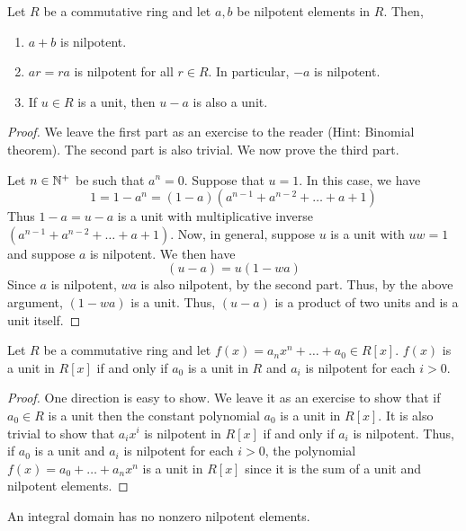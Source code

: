 \begin{prop} \label{prop:nilpotent-properties}
    Let $R$ be a commutative ring and let $a,b$ be nilpotent elements in $R$. Then, 
    \begin{enumerate}
        \item $a+b$ is nilpotent.
        \item $ar = ra$ is nilpotent for all $r \in R$. In particular, $-a$ is nilpotent.
        \item If $u \in R$ is a unit, then $u-a$ is also a unit.
    \end{enumerate}
\end{prop}
\begin{proof}
    We leave the first part as an exercise to the reader (Hint: Binomial theorem). The second part is also trivial. We now prove the third part. 
    
    \medskip
    
    Let $n \in \mathbb{N}^+$ be such that $a^n = 0$. Suppose that $u = 1$. In this case, we have
    \[
        1 = 1 - a^n = (1-a)(a^{n-1} + a^{n-2} + \ldots + a + 1)
    \]
    Thus $1-a = u-a$ is a unit with multiplicative inverse $(a^{n-1} + a^{n-2} + \ldots + a + 1)$. Now, in general, suppose $u$ is a unit with $uw = 1$ and suppose $a$ is nilpotent. We then have
    \[  
        (u-a) = u(1 - wa)
    \]
    Since $a$ is nilpotent, $wa$ is also nilpotent, by the second part. Thus, by the above argument, $(1-wa)$ is a unit. Thus, $(u-a)$ is a product of two units and is a unit itself.
\end{proof}

\begin{theorem} \label{thm:condition-for-unit-in-polynomial-ring}
    Let $R$ be a commutative ring and let $f(x) = a_nx^n + \ldots + a_0 \in R[x]$. $f(x)$ is a unit in $R[x]$ if and only if $a_0$ is a unit in $R$ and $a_i$ is nilpotent for each $i > 0$.
\end{theorem}
\begin{proof}
    One direction is easy to show. We leave it as an exercise to show that if $a_0 \in R$ is a unit then the constant polynomial $a_0$ is a unit in $R[x]$. It is also trivial to show that $a_i x^i$ is nilpotent in $R[x]$ if and only if $a_i$ is nilpotent. Thus, if $a_0$ is a unit and $a_i$ is nilpotent for each $i>0$, the polynomial $f(x) = a_0 + \ldots + a_nx^n$ is a unit in $R[x]$ since it is the sum of a unit and nilpotent elements.
\end{proof}

\begin{prop} \label{prop:no-nilpotent-in-integral}
    An integral domain has no nonzero nilpotent elements.
\end{prop}

